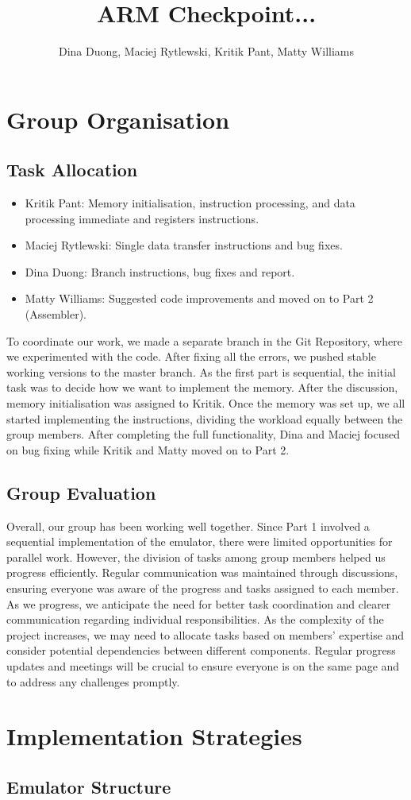 \documentclass[11pt]{article}
\begin{document}
\title{ARM Checkpoint... }
\author{Dina Duong, Maciej Rytlewski, Kritik Pant, Matty Williams}

\maketitle

\section{Group Organisation}

\subsection*{Task Allocation}

\begin{itemize}
    \item Kritik Pant: Memory initialisation, instruction processing, and data processing immediate and registers instructions.
    \item Maciej Rytlewski: Single data transfer instructions and bug fixes.
    \item Dina Duong: Branch instructions, bug fixes and report. 
    \item Matty Williams: Suggested code improvements and moved on to Part 2 (Assembler).
\end{itemize}
To coordinate our work, we made a separate branch in the Git Repository, where we experimented with the code. 
After fixing all the errors, we pushed stable working versions to the master branch. 
As the first part is sequential, the initial task was to decide how we want to implement the memory. 
After the discussion, memory initialisation was assigned to Kritik. Once the memory was set up, we all started 
implementing the instructions, dividing the workload equally between the group members. 
After completing the full functionality, Dina and Maciej focused on bug fixing while Kritik and Matty moved on to Part 2.

\subsection*{Group Evaluation}
Overall, our group has been working well together. Since Part 1 involved a sequential implementation of the emulator, 
there were limited opportunities for parallel work. However, the division of tasks among group members helped us progress efficiently.
Regular communication was maintained through discussions, ensuring everyone was aware of the progress and tasks assigned to each member.
\newline
As we progress, we anticipate the need for better task coordination and clearer communication regarding individual responsibilities. 
As the complexity of the project increases, we may need to allocate tasks based on members' expertise and consider potential 
dependencies between different components. Regular progress updates and meetings will be crucial to ensure 
everyone is on the same page and to address any challenges promptly.

\section{Implementation Strategies}

\subsection*{Emulator Structure}
\end{document}
